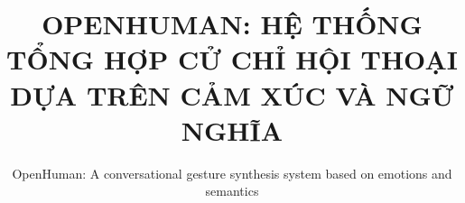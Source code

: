 \documentclass[10pt,mathserif]{beamer}
\title{\large \bfseries OPENHUMAN: HỆ THỐNG TỔNG HỢP CỬ CHỈ HỘI THOẠI DỰA TRÊN CẢM XÚC VÀ NGỮ NGHĨA}
\subtitle{OpenHuman: A conversational gesture synthesis system based on emotions and semantics}
\begin{document}
\begin{frame}[plain]
	\titlepage
\end{frame}



















\end{document}

